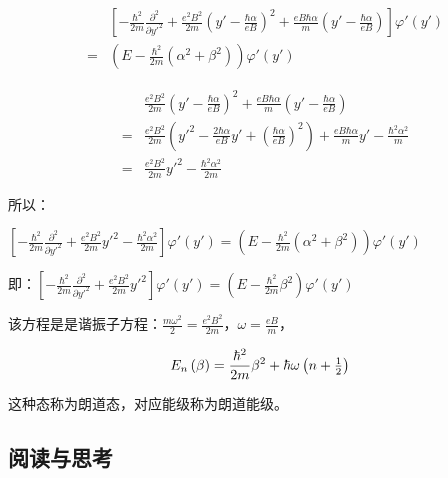 \begin{eqnarray*}
{} &{}& \left[ { - \frac{{\hbar ^2 }}{{2m}}\frac{{\partial ^2 }}{{\partial y'^2 }} + \frac{{e^2 B^2 }}{{2m}}\left( {y' - \frac{{\hbar \alpha }}{{eB}}} \right)^2  + \frac{{eB\hbar \alpha }}{m}\left( {y' - \frac{{\hbar \alpha }}{{eB}}} \right)} \right]\varphi '\left( {y'} \right) \\
{} &=& \left( {E - \frac{{\hbar ^2 }}{{2m}}\left( {\alpha ^2  + \beta ^2 } \right)} \right)\varphi '\left( {y'} \right)
\end{eqnarray*}

\begin{eqnarray*}
{} &{}& \frac{{e^2 B^2 }}{{2m}}\left( {y' - \frac{{\hbar \alpha }}{{eB}}} \right)^2  + \frac{{eB\hbar \alpha }}{m}\left( {y' - \frac{{\hbar \alpha }}{{eB}}} \right) \\
{} &{=}& \frac{{e^2 B^2 }}{{2m}}\left( {y'^2  - \frac{{2\hbar \alpha }}{{eB}}y' + \left( {\frac{{\hbar \alpha }}{{eB}}} \right)^2 } \right) + \frac{{eB\hbar \alpha }}{m}y' - \frac{{\hbar ^2 \alpha ^2 }}{m}  \\
{} &{=}&  \frac{{e^2 B^2 }}{{2m}}y'^2  - \frac{{\hbar ^2 \alpha ^2 }}{{2m}} \end{eqnarray*}

所以：

$\left[ { - \frac{{\hbar ^2 }}{{2m}}\frac{{\partial ^2 }}{{\partial y'^2 }} + \frac{{e^2 B^2 }}{{2m}}y'^2  - \frac{{\hbar ^2 \alpha ^2 }}{{2m}}} \right]\varphi '\left( {y'} \right) = \left( {E - \frac{{\hbar ^2 }}{{2m}}\left( {\alpha ^2  + \beta ^2 } \right)} \right)\varphi '\left( {y'} \right)$

即：$\left[ { - \frac{{\hbar ^2 }}{{2m}}\frac{{\partial ^2 }}{{\partial y'^2 }} + \frac{{e^2 B^2 }}{{2m}}y'^2 } \right]\varphi '\left( {y'} \right) = \left( {E - \frac{{\hbar ^2 }}{{2m}}\beta ^2 } \right)\varphi '\left( {y'} \right)$

该方程是是谐振子方程：$\frac{{m\omega ^2 }}{2} = \frac{{e^2 B^2 }}{{2m}}$，$\omega  = \frac{{eB}}{m}$，

\begin{equation}
E_n \left( \beta  \right) = \frac{{\hbar ^2 }}{{2m}}\beta ^2  + \hbar \omega \left( {n + {\textstyle{1 \over 2}}} \right)
\end{equation}

这种态称为朗道态，对应能级称为朗道能级。

\subsection*{阅读与思考}

